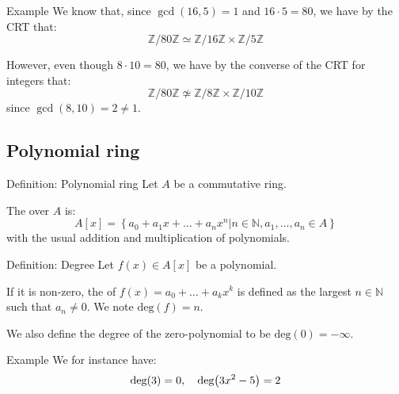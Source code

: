 \documentclass[a4paper]{article}
\begin{document}
\begin{parag}{Example}
    We know that, since $\gcd\left(16, 5\right) = 1$ and $16\cdot 5 = 80$, we have by the CRT that:
    \[\mathbb{Z}/80\mathbb{Z} \simeq \mathbb{Z}/16\mathbb{Z} \times \mathbb{Z}/5\mathbb{Z}\]
    
    However, even though $8\cdot 10 = 80$, we have by the converse of the CRT for integers that:
    \[\mathbb{Z}/80\mathbb{Z} \not\simeq \mathbb{Z}/8\mathbb{Z} \times \mathbb{Z}/10\mathbb{Z}\]
    since $\gcd\left(8, 10\right) = 2 \neq 1$.
\end{parag}

\subsection{Polynomial ring}

\begin{parag}{Definition: Polynomial ring}
    Let $A$ be a commutative ring. 

    The  over $A$ is:
    \[A \left[x\right] = \left\{a_0 + a_1 x + \ldots + a_n x^n | n \in \mathbb{N}, a_1, \ldots, a_n \in A\right\}\]
    with the usual addition and multiplication of polynomials.
\end{parag}

\begin{parag}{Definition: Degree}
    Let $f\left(x\right) \in A\left[x\right]$ be a polynomial.

    If it is non-zero, the  of $f\left(x\right) = a_0 + \ldots + a_k x^k$ is defined as the largest $n \in \mathbb{N}$ such that $a_n \neq 0$. We note $\text{deg}\left(f\right) = n$.

    We also define the degree of the zero-polynomial to be $\text{deg}\left(0\right) = -\infty$.
    
    \begin{subparag}{Example}
        We for instance have: 
        \[\text{deg}\left(3\right) = 0, \mathspace \text{deg}\left(3x^2 - 5\right) = 2\]
    \end{subparag}
\end{parag}
\end{document}
